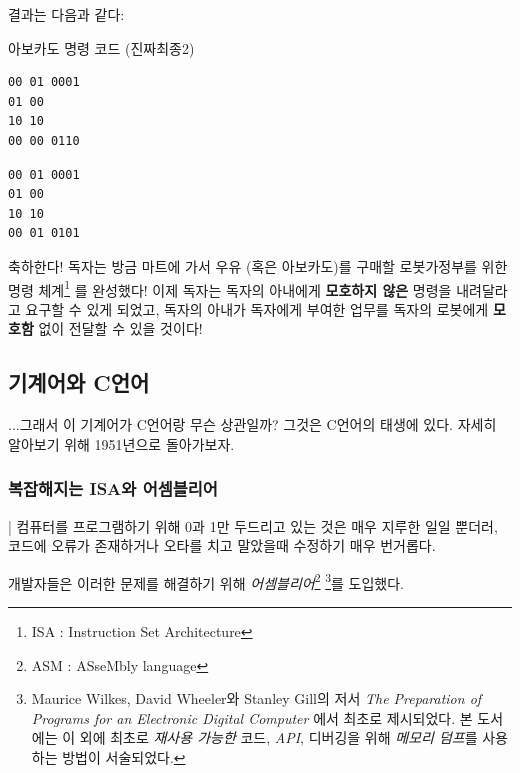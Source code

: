 \documentclass{article}
\begin{document}
결과는 다음과 같다:

\begin{center}

    \centering
    
    아보카도 명령 코드 (진짜최종2)

    \begin{minipage}{0.45\textwidth}
        \begin{lstlisting}
00 01 0001
01 00
10 10
00 00 0110
        \end{lstlisting}
    \end{minipage}
    \hfill
    \begin{minipage}{0.45\textwidth}
        \begin{lstlisting}
00 01 0001
01 00
10 10
00 01 0101
        \end{lstlisting}
    \end{minipage}

\end{center}

축하한다! 독자는 방금 마트에 가서 우유 (혹은 아보카도)를 구매할
로봇가정부를 위한 명령 체계\footnote{ISA : Instruction Set Architecture}
를 완성했다!
이제 독자는 독자의 아내에게 \textbf{모호하지 않은} 명령을 내려달라고
요구할 수 있게 되었고, 독자의 아내가 독자에게 부여한 업무를 독자의
로봇에게 \textbf{모호함} 없이 전달할 수 있을 것이다!

\subsection{기계어와 C언어}

...그래서 이 기계어가 C언어랑 무슨 상관일까?
그것은 C언어의 태생에 있다.
자세히 알아보기 위해 1951년으로 돌아가보자.

\subsubsection{복잡해지는 ISA와 어셈블리어}

| 컴퓨터를 프로그램하기 위해 0과 1만 두드리고 있는 것은
매우 지루한 일일 뿐더러, 코드에 오류가 존재하거나 오타를 치고 말았을때
수정하기 매우 번거롭다.

개발자들은 이러한 문제를 해결하기 위해
\textit{어셈블리어}\footnote{ASM : ASseMbly language}
\footnote{
    Maurice Wilkes, David Wheeler와 Stanley Gill의 저서
    \textit{The Preparation of Programs for an Electronic Digital Computer}
    에서 최초로 제시되었다.
    본 도서에는 이 외에 최초로 \textit{재사용 가능한} 코드, \textit{API},
    디버깅을 위해 \textit{메모리 덤프}를 사용하는 방법이 서술되었다.
}를 도입했다. 
\end{document}
